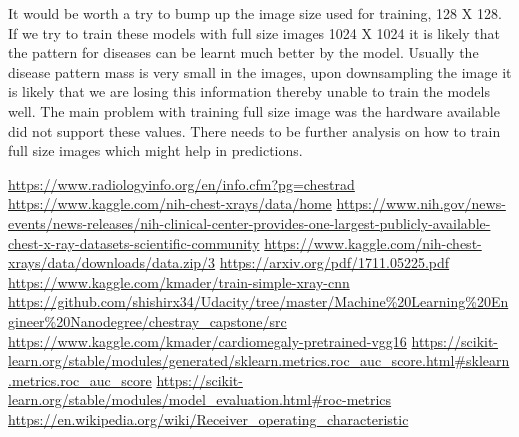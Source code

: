 \documentclass{article}
\begin{document}
    It would be worth a try to bump up the image size used for training, 128 X 128. If we try to train these models with full size images 1024 X 1024 it is likely that the pattern for diseases can be learnt much better by the model. Usually the disease pattern mass is very small in the images, upon downsampling the image it is likely that we are losing this information thereby unable to train the models well. The main problem with training full size image was the hardware available did not support these values. There needs to be further analysis on how to train full size images which might help in predictions.

    \begin{thebibliography}{999}

         \url{https://www.radiologyinfo.org/en/info.cfm?pg=chestrad}
         \url{https://www.kaggle.com/nih-chest-xrays/data/home} 
         \url{https://www.nih.gov/news-events/news-releases/nih-clinical-center-provides-one-largest-publicly-available-chest-x-ray-datasets-scientific-community}
         \url{https://www.kaggle.com/nih-chest-xrays/data/downloads/data.zip/3}
         \url{https://arxiv.org/pdf/1711.05225.pdf}
         \url{https://www.kaggle.com/kmader/train-simple-xray-cnn}
         \url{https://github.com/shishirx34/Udacity/tree/master/Machine%20Learning%20Engineer%20Nanodegree/chestray_capstone/src}
         \url{https://www.kaggle.com/kmader/cardiomegaly-pretrained-vgg16}
         \url{https://scikit-learn.org/stable/modules/generated/sklearn.metrics.roc_auc_score.html#sklearn.metrics.roc_auc_score}
         \url{https://scikit-learn.org/stable/modules/model_evaluation.html#roc-metrics}
         \url{https://en.wikipedia.org/wiki/Receiver_operating_characteristic}

    \end{thebibliography}
\end{document}
